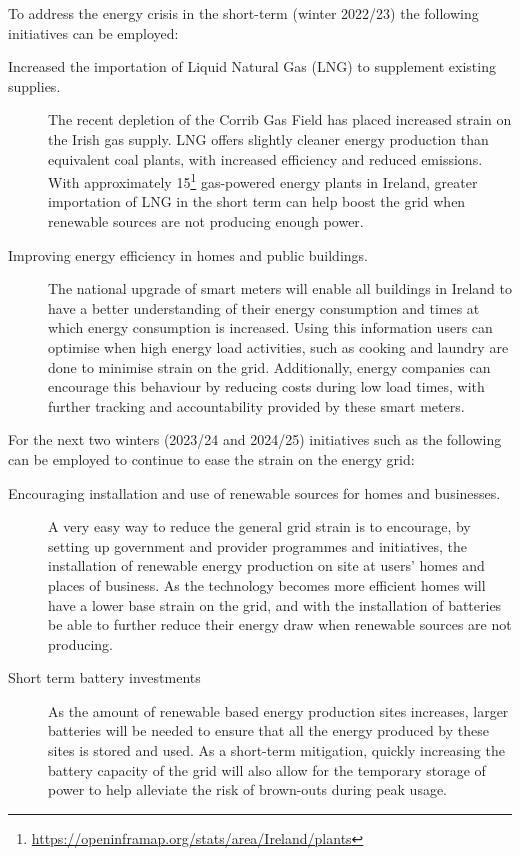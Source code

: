 \documentclass{article}
\begin{document}
    To address the energy crisis in the short-term (winter 2022/23) the following initiatives can be employed:
    \begin{description}
        \item [Increased the importation of Liquid Natural Gas (LNG) to supplement existing supplies.] The recent depletion of the Corrib Gas Field has placed increased strain on the Irish gas supply. LNG offers slightly cleaner energy production than equivalent coal plants, with increased efficiency and reduced  emissions. With approximately 15\footnote{\url{https://openinframap.org/stats/area/Ireland/plants}} gas-powered energy plants in Ireland, greater importation of LNG in the short term can help boost the grid when renewable sources are not producing enough power.
        \item [Improving energy efficiency in homes and public buildings.] The national upgrade of smart meters will enable all buildings in Ireland to have a better understanding of their energy consumption and times at which energy consumption is increased. Using this information users can optimise when high energy load activities, such as cooking and laundry are done to minimise strain on the grid. Additionally, energy companies can encourage this behaviour by reducing costs during low load times, with further tracking and accountability provided by these smart meters.
    \end{description}

    For the next two winters (2023/24 and 2024/25) initiatives such as the following can be employed to continue to ease the strain on the energy grid:
    \begin{description}
        \item[Encouraging installation and use of renewable sources for homes and businesses.] A very easy way to reduce the general grid strain is to encourage, by setting up government and provider programmes and initiatives, the installation of renewable energy production on site at users' homes and places of business. As the technology becomes more efficient homes will have a lower base strain on the grid, and with the installation of batteries be able to further reduce their energy draw when renewable sources are not producing.
        \item[Short term battery investments] As the amount of renewable based energy production sites increases, larger batteries will be needed to ensure that all the energy produced by these sites is stored and used. As a short-term mitigation, quickly increasing the battery capacity of the grid will also allow for the temporary storage of power to help alleviate the risk of brown-outs during peak usage.
    \end{description}
\end{document}
